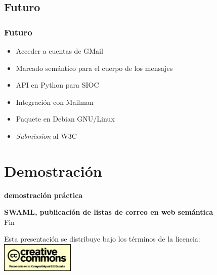 \documentclass[spanish,notes=hide]{beamer}
\begin{document}
\subsection{Futuro}
\frame
{
  \frametitle{Futuro}
  \begin{itemize}
   \item \begin{Large}Acceder a cuentas de GMail\end{Large}
   \item \begin{Large}Marcado semántico para el cuerpo de los mensajes\end{Large}
   \item \begin{Large}API en Python para SIOC\end{Large}
   \item \begin{Large}Integración con Mailman\end{Large}
   \item \begin{Large}Paquete en Debian GNU/Linux\end{Large}
   \item \begin{Large}\textit{Submission} al W3C\end{Large}
  \end{itemize}
}

\section{Demostración}
\frame
{

  \begin{center}
    \LARGE{\textbf{demostración práctica}}
  \end{center}
}
\frame
{

  \begin{center}
    \LARGE{\textbf{SWAML, publicación de listas de correo en web semántica}}\\
    \vspace{1cm}
    \LARGE{Fin}\\
    \vspace{1cm}
    \begin{tiny}
	Esta presentación se distribuye bajo los términos de la licencia:\\
	\includegraphics[width=3.5cm]{images/creativecommons.png}
    \end{tiny}
  \end{center}
}
\end{document}
